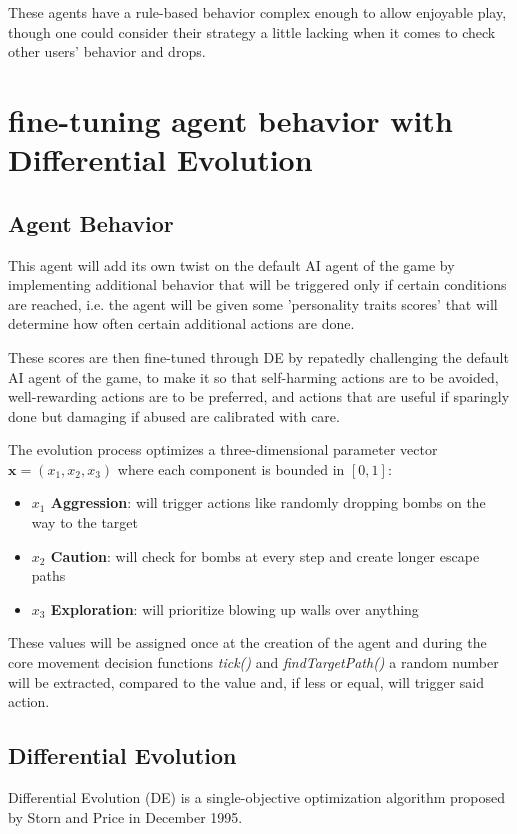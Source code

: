 \documentclass[sigconf]{acmart} %
\begin{document}
These agents have a rule-based behavior complex enough to allow enjoyable play, though one could consider their strategy a little lacking when it comes to check other users' behavior and drops. 

\section{fine-tuning agent behavior with Differential Evolution}
\label{de_train}

\subsection{Agent Behavior}
This agent will add its own twist on the default AI agent of the game by implementing additional behavior that will be triggered only if certain conditions are reached, i.e. the agent will be given some 'personality traits scores' that will determine how often certain additional actions are done.

These scores are then fine-tuned through DE by repatedly challenging the default AI agent of the game, to make it so that self-harming actions are to be avoided, well-rewarding actions are to be preferred, and actions that are useful if sparingly done but damaging if abused are calibrated with care.

The evolution process optimizes a three-dimensional parameter vector $\mathbf{x} = (x_1, x_2, x_3)$ where each component is bounded in $[0,1]$:
\begin{itemize}
    \item \textbf{$x_1$ Aggression}: will trigger actions like randomly dropping bombs on the way to the target
    \item \textbf{$x_2$ Caution}: will check for bombs at every step and create longer escape paths
    \item \textbf{$x_3$ Exploration}: will prioritize blowing up walls over anything
\end{itemize}

These values will be assigned once at the creation of the agent and during the core movement decision functions \textit{tick()} and \textit{findTargetPath()} a random number will be extracted, compared to the value and, if less or equal, will trigger said action.

\subsection{Differential Evolution}
Differential Evolution (DE) is a single-objective optimization algorithm proposed by Storn and Price in December 1995.\cite{qiita_DE} 
\end{document}
